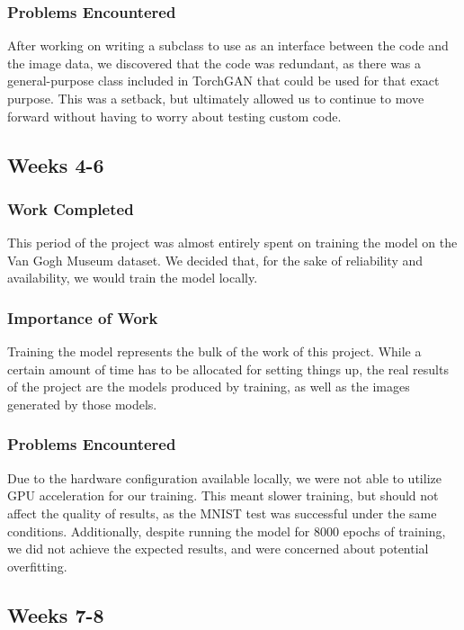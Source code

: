 \documentclass[12pt,letterpaper]{article}
\begin{document}
			\subsubsection{Problems Encountered}
				After working on writing a subclass to use as an interface between the code and the image data, we discovered that the code was redundant, as there was a general-purpose class included in TorchGAN that could be used for that exact purpose.
				This was a setback, but ultimately allowed us to continue to move forward without having to worry about testing custom code.

		\subsection{Weeks 4-6}
			\subsubsection{Work Completed}
				This period of the project was almost entirely spent on training the model on the Van Gogh Museum dataset.
				We decided that, for the sake of reliability and availability, we would train the model locally.
			\subsubsection{Importance of Work}
				Training the model represents the bulk of the work of this project.
				While a certain amount of time has to be allocated for setting things up, the real results of the project are the models produced by training, as well as the images generated by those models.
			\subsubsection{Problems Encountered}
				Due to the hardware configuration available locally, we were not able to utilize GPU acceleration for our training.
				This meant slower training, but should not affect the quality of results, as the MNIST test was successful under the same conditions.
				Additionally, despite running the model for 8000 epochs of training, we did not achieve the expected results, and were concerned about potential overfitting.

		\subsection{Weeks 7-8}
\end{document}
